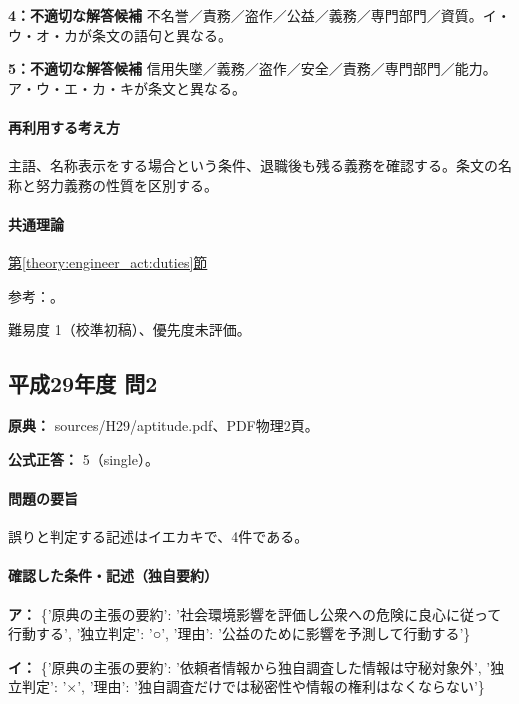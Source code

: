 \noindent\textbf{4：不適切な解答候補} 不名誉／責務／盗作／公益／義務／専門部門／資質。イ・ウ・オ・カが条文の語句と異なる。\par

\noindent\textbf{5：不適切な解答候補} 信用失墜／義務／盗作／安全／責務／専門部門／能力。ア・ウ・エ・カ・キが条文と異なる。\par

\paragraph{再利用する考え方} 主語、名称表示をする場合という条件、退職後も残る義務を確認する。条文の名称と努力義務の性質を区別する。

\paragraph{共通理論} \hyperref[theory:engineer_act:duties]{第\ref*{theory:engineer_act:duties}節}

\par 参考：\cite{engineer_act_current}。

\par 難易度 1（校準初稿）、優先度未評価。

\subsection{平成29年度 問2}
\label{q:h29-reg-apt-02}

\noindent\textbf{原典：} sources/H29/aptitude.pdf、PDF物理2頁。

\textbf{公式正答：} 5（single）。

\paragraph{問題の要旨} 誤りと判定する記述はイエカキで、4件である。

\paragraph{確認した条件・記述（独自要約）}\mbox{}\par

\noindent\textbf{ア：} \{'原典の主張の要約': '社会環境影響を評価し公衆への危険に良心に従って行動する', '独立判定': '○', '理由': '公益のために影響を予測して行動する'\}\par

\noindent\textbf{イ：} \{'原典の主張の要約': '依頼者情報から独自調査した情報は守秘対象外', '独立判定': '×', '理由': '独自調査だけでは秘密性や情報の権利はなくならない'\}\par

